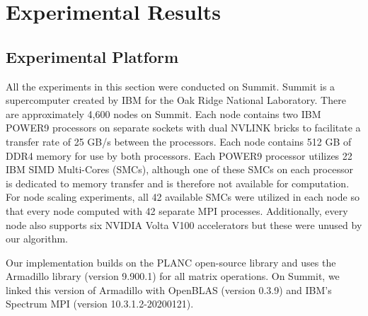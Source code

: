 
\section{Experimental Results}
\label{sec:results}

\subsection{Experimental Platform}
\label{sec:summit}

All the experiments in this section were conducted on Summit. Summit is a supercomputer created by IBM for the Oak Ridge National Laboratory. 
There are approximately 4,600 nodes on Summit. Each node contains two IBM POWER9 processors on separate sockets with dual NVLINK bricks to facilitate a transfer rate of 
25 GB/s between the processors. Each node contains 512 GB of DDR4 memory for use by both processors. Each POWER9 processor utilizes 22 IBM SIMD Multi-Cores (SMCs), 
although one of these SMCs on each processor is dedicated to memory transfer and is therefore not available for computation. 
For node scaling experiments, all 42 available SMCs were utilized in each node so that every node computed with 42 separate MPI processes.
Additionally, every node also supports six NVIDIA Volta V100 accelerators but these were unused by our algorithm. 

Our implementation builds on the PLANC open-source library and uses the Armadillo library (version 9.900.1) for all matrix operations. 
On Summit, we linked this version of Armadillo with OpenBLAS (version 0.3.9) and IBM's Spectrum MPI (version 10.3.1.2-20200121).

